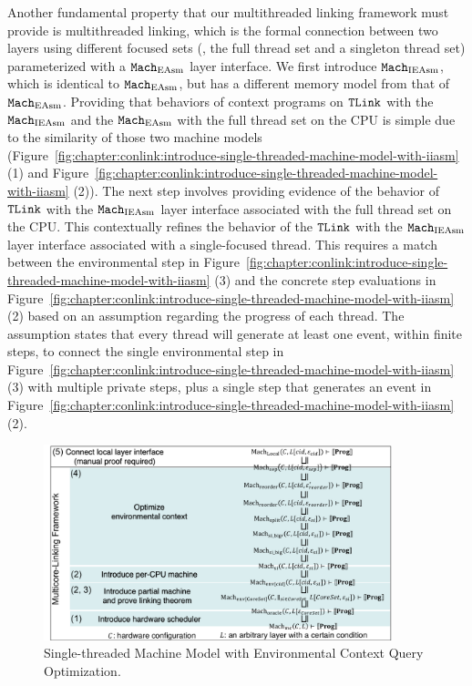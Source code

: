 Another fundamental property that our multithreaded linking framework must provide is multithreaded linking, which is the formal connection between two layers using different focused sets (\ie, the full thread set and a singleton thread set) parameterized with a ${\mathrm{\texttt{Mach}}}_{\mathrm{EAsm}}$ 
layer interface. 
We first introduce ${\mathrm{\texttt{Mach}}}_{\mathrm{IEAsm}}$, which is identical to  ${\mathrm{\texttt{Mach}}}_{\mathrm{EAsm}}$, but has a different memory model from that of ${\mathrm{\texttt{Mach}}}_{\mathrm{EAsm}}$.
Providing that behaviors of context programs on ${{\mathrm{\texttt{TLink}}}}$ with the ${\mathrm{\texttt{Mach}}}_{\mathrm{IEAsm}}$  and the ${\mathrm{\texttt{Mach}}}_{\mathrm{EAsm}}$ with the full thread set on the CPU is simple 
due to the similarity of those two machine models (Figure~\ref{fig:chapter:conlink:introduce-single-threaded-machine-model-with-iiasm} (1) and Figure~\ref{fig:chapter:conlink:introduce-single-threaded-machine-model-with-iiasm} (2)). 
The next step involves providing evidence of the behavior of ${{\mathrm{\texttt{TLink}}}}$ with the ${\mathrm{\texttt{Mach}}}_{\mathrm{IEAsm}}$ layer interface associated with the full thread set on the CPU. 
This contextually refines the behavior of the ${{\mathrm{\texttt{TLink}}}}$ with the ${\mathrm{\texttt{Mach}}}_{\mathrm{IEAsm}}$ layer interface associated with a single-focused thread. 
This requires a match between the environmental step in Figure~\ref{fig:chapter:conlink:introduce-single-threaded-machine-model-with-iiasm} (3) and the concrete step evaluations in Figure~\ref{fig:chapter:conlink:introduce-single-threaded-machine-model-with-iiasm} (2) based on an assumption regarding the progress of each thread. 
The assumption states that every thread will generate at least one event, within finite steps, to connect the single environmental step in Figure~\ref{fig:chapter:conlink:introduce-single-threaded-machine-model-with-iiasm} (3) with multiple private steps, plus a single step that generates an event in Figure~\ref{fig:chapter:conlink:introduce-single-threaded-machine-model-with-iiasm} (2).

\begin{figure}
\begin{center}
\includegraphics[width=0.9\textwidth, page=8]{figs/conlink/concurrent_linking}
\end{center}
\caption{Single-threaded Machine Model with Environmental Context Query Optimization.}
\label{fig:chapter:conlink:introduce-single-threaded-machine-model-with-tasm}
\end{figure}

